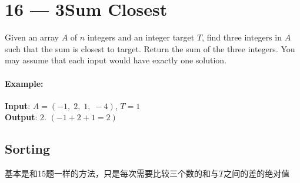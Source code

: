 \section{16 --- 3Sum Closest}
Given an array $A$ of $  n $ integers and an integer target $ T $, find three integers in $ A $ such that the sum is closest to target. Return the sum of the three integers. You may assume that each input would have exactly one solution.

\paragraph{Example:}
\begin{flushleft}
\textbf{Input}: $ A = (-1,\; 2,\; 1,\; -4) $, \quad $ T = 1 $
\\
\textbf{Output}: 2. $ (-1 + 2 + 1 = 2) $
\end{flushleft}
\subsection{Sorting}
基本是和15题一样的方法，只是每次需要比较三个数的和与$T$之间的差的绝对值